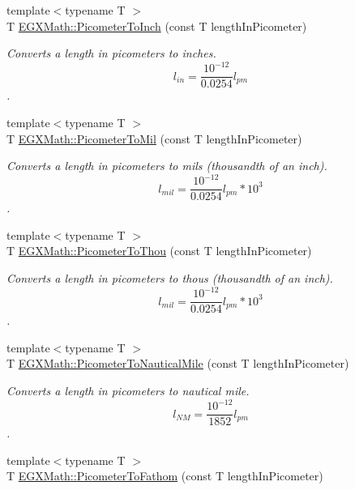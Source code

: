 \begin{DoxyCompactItemize}
{\footnotesize template$<$typename T $>$ }\\T \mbox{\hyperlink{group___e_g_x_math-_conversions-_length_conversions-_s_i-_picometer-_imperial_ga163afd72563986ed456466be07efd3cb}{E\+G\+X\+Math\+::\+Picometer\+To\+Inch}} (const T length\+In\+Picometer)
\begin{DoxyCompactList}\small\item\em Converts a length in picometers to inches. \[ l_{in}= \frac{10^{-12}}{0.0254} l_{pm} \]. \end{DoxyCompactList}\item 
{\footnotesize template$<$typename T $>$ }\\T \mbox{\hyperlink{group___e_g_x_math-_conversions-_length_conversions-_s_i-_picometer-_imperial_ga727778c82b4049ff45091f492993150d}{E\+G\+X\+Math\+::\+Picometer\+To\+Mil}} (const T length\+In\+Picometer)
\begin{DoxyCompactList}\small\item\em Converts a length in picometers to mils (thousandth of an inch). \[ l_{mil}= \frac{10^{-12}}{0.0254} l_{pm} * 10^{3} \]. \end{DoxyCompactList}\item 
{\footnotesize template$<$typename T $>$ }\\T \mbox{\hyperlink{group___e_g_x_math-_conversions-_length_conversions-_s_i-_picometer-_imperial_gabf48007bf90e25f6d23f847101fd35f1}{E\+G\+X\+Math\+::\+Picometer\+To\+Thou}} (const T length\+In\+Picometer)
\begin{DoxyCompactList}\small\item\em Converts a length in picometers to thous (thousandth of an inch). \[ l_{mil}= \frac{10^{-12}}{0.0254} l_{pm} * 10^{3} \]. \end{DoxyCompactList}\item 
{\footnotesize template$<$typename T $>$ }\\T \mbox{\hyperlink{group___e_g_x_math-_conversions-_length_conversions-_s_i-_picometer-_nautical_ga7127ef6c7c68736b7a24d2c65b8ac858}{E\+G\+X\+Math\+::\+Picometer\+To\+Nautical\+Mile}} (const T length\+In\+Picometer)
\begin{DoxyCompactList}\small\item\em Converts a length in picometers to nautical mile. \[ l_{NM}= \frac{10^{-12}}{1852} l_{pm} \]. \end{DoxyCompactList}\item 
{\footnotesize template$<$typename T $>$ }\\T \mbox{\hyperlink{group___e_g_x_math-_conversions-_length_conversions-_s_i-_picometer-_nautical_ga1d8f092a0b6d47c4eaac5d9d19512d84}{E\+G\+X\+Math\+::\+Picometer\+To\+Fathom}} (const T length\+In\+Picometer)

\end{DoxyCompactItemize}
